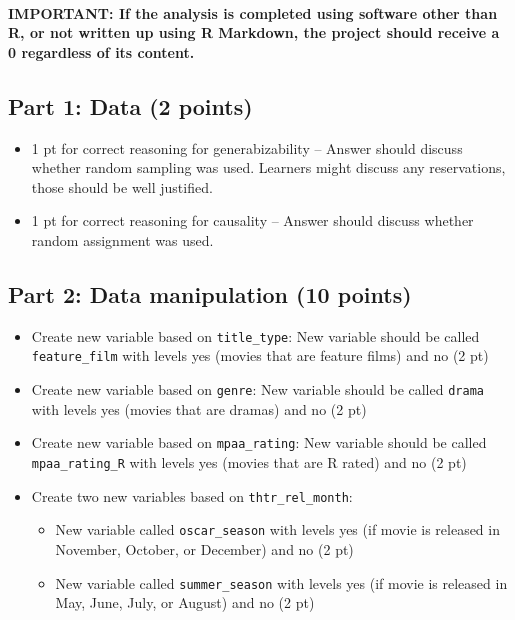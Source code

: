 \documentclass[
]{article}
\author{}
\date{\vspace{-2.5em}}
\providecommand{\tightlist}{%
  \setlength{\itemsep}{0pt}\setlength{\parskip}{0pt}}
\begin{document}
\hypertarget{important-if-the-analysis-is-completed-using-software-other-than-r-or-not-written-up-using-r-markdown-the-project-should-receive-a-0-regardless-of-its-content.}{%
\paragraph{IMPORTANT: If the analysis is completed using software other
than R, or not written up using R Markdown, the project should receive a
0 regardless of its
content.}\label{important-if-the-analysis-is-completed-using-software-other-than-r-or-not-written-up-using-r-markdown-the-project-should-receive-a-0-regardless-of-its-content.}}

\hypertarget{part-1-data-2-points}{%
\subsection{Part 1: Data (2 points)}\label{part-1-data-2-points}}

\begin{itemize}
\item
  1 pt for correct reasoning for generabizability -- Answer should
  discuss whether random sampling was used. Learners might discuss any
  reservations, those should be well justified.
\item
  1 pt for correct reasoning for causality -- Answer should discuss
  whether random assignment was used.
\end{itemize}

\hypertarget{part-2-data-manipulation-10-points}{%
\subsection{Part 2: Data manipulation (10
points)}\label{part-2-data-manipulation-10-points}}

\begin{itemize}
\tightlist
\item
  Create new variable based on \texttt{title\_type}: New variable should
  be called \texttt{feature\_film} with levels yes (movies that are
  feature films) and no (2 pt)
\item
  Create new variable based on \texttt{genre}: New variable should be
  called \texttt{drama} with levels yes (movies that are dramas) and no
  (2 pt)
\item
  Create new variable based on \texttt{mpaa\_rating}: New variable
  should be called \texttt{mpaa\_rating\_R} with levels yes (movies that
  are R rated) and no (2 pt)
\item
  Create two new variables based on \texttt{thtr\_rel\_month}:

  \begin{itemize}
  \tightlist
  \item
    New variable called \texttt{oscar\_season} with levels yes (if movie
    is released in November, October, or December) and no (2 pt)
  \item
    New variable called \texttt{summer\_season} with levels yes (if
    movie is released in May, June, July, or August) and no (2 pt)
  \end{itemize}
\end{itemize}
\end{document}
